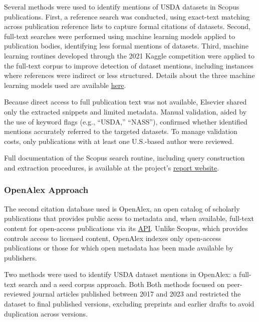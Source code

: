 \documentclass[
  letterpaper,
  DIV=11,
  numbers=noendperiod]{scrartcl}
\begin{document}
Several methods were used to identify mentions of USDA datasets in
Scopus publications. First, a reference search was conducted, using
exact-text matching across publication reference lists to capture formal
citations of datasets. Second, full-text searches were performed using
machine learning models applied to publication bodies, identifying less
formal mentions of datasets. Third, machine learning routines developed
through the 2021 Kaggle competition were applied to the full-text corpus
to improve detection of dataset mentions, including instances where
references were indirect or less structured. Details about the three
machine learning models used are available
\href{https://github.com/democratizingdata/democratizingdata-ml-algorithms/blob/main/README.md}{here}.

Because direct access to full publication text was not available,
Elsevier shared only the extracted snippets and limited metadata. Manual
validation, aided by the use of keyword flags (e.g., ``USDA,''
``NASS''), confirmed whether identified mentions accurately referred to
the targeted datasets. To manage validation costs, only publications
with at least one U.S.-based author were reviewed.

Full documentation of the Scopus search routine, including query
construction and extraction procedures, is available at the project's
\href{https://laurenchenarides.github.io/compare_scopus_openalex_report/workflow/step02_01/extract_dataset_mentions.html}{report
website}.

\subsubsection{OpenAlex Approach}\label{openalex-approach}

The second citation database used is OpenAlex, an open catalog of
scholarly publications that provides public acess to metadata and, when
available, full-text content for open-access publications via its
\href{https://docs.openalex.org/how-to-use-the-api/api-overview}{API}.
Unlike Scopus, which provides controls access to licensed content,
OpenAlex indexes only open-access publications or those for which open
metadata has been made available by publishers.

Two methods were used to identify USDA dataset mentions in OpenAlex: a
full-text search and a seed corpus approach. Both Both methods focused
on peer-reviewed journal articles published between 2017 and 2023 and
restricted the dataset to final published versions, excluding preprints
and earlier drafts to avoid duplication across versions.
\end{document}
